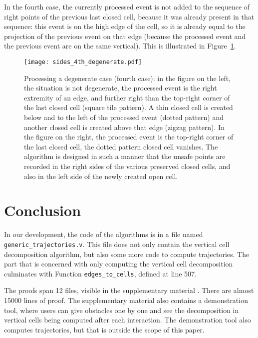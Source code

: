 \documentclass[a4paper, USenglish, cleveref, autoref, thm-restate, final]{lipics-v2021}
\begin{document}
In the fourth case, the currently processed event is not added to the
sequence of right points of the previous last closed cell, because it
was already present in that sequence: this event is on the high edge of
the cell, so it is already equal to the projection of the previous event
on that edge (because the processed event and the previous event are on
the same vertical).  This is illustrated in Figure~\ref{fig:fourth_case_degenerate}.

\begin{figure}
\begin{center}
\texttt{[image: sides\_4th\_degenerate.pdf]}
\end{center}
\caption{Processing a degenerate case (fourth case):
  in the figure on the left, the situation is not degenerate, the
   processed event is the right extremity
  of an edge, and further right than the top-right corner of the last
  closed cell (square tile pattern).
  A   thin closed cell is created below and to the left of the processed
  event (dotted pattern) and another closed cell
  is created above that edge (zigzag pattern).  In the figure on the right,
  the processed event
  is the top-right corner of the last closed cell, the dotted pattern
  closed cell vanishes.  The algorithm is designed in such a manner that the
  unsafe points are recorded in the right sides of the various
  preserved closed cells, and also in the left side of the newly
  created open cell.
  }
\label{fig:fourth_case_degenerate}
\end{figure}
\section{Conclusion}
In our development, the code of the algorithms is in a
file named {\tt generic\_trajectories.v}.  This file does not only contain
the vertical cell decomposition algorithm, but also some more code to compute
trajectories.  The part that is concerned with only computing the vertical
cell decomposition culminates with Function {\tt edges\_to\_cells}, defined
at line 507.

The proofs span 12 files, visible in the supplementary material \cite{suppl_material}.
There are almost 15000 lines of proof.  The supplementary material also
contains a demonstration tool, where users can give obstacles one by one
and see the decomposition in vertical cells being computed after each
interaction.  The demonstration tool also computes trajectories, but that
is outside the scope of this paper.
\end{document}
